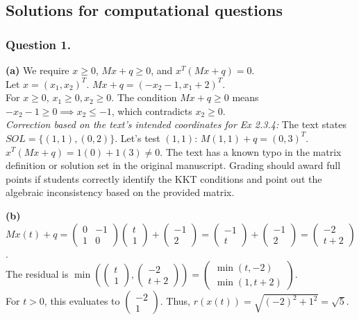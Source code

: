 \documentclass[pdflatex,sn-mathphys-num]{sn-jnl}%
\theoremstyle{definition}
\begin{document}
\subsection{Solutions for computational questions}

\subsubsection{Question 1.}
\textbf{(a)} We require $x \ge 0$, $Mx+q \ge 0$, and $x^T(Mx+q) = 0$. \\
Let $x = (x_1, x_2)^T$. $Mx+q = (-x_2 - 1, x_1 + 2)^T$. \\
For $x \ge 0$, $x_1 \ge 0, x_2 \ge 0$. The condition $Mx+q \ge 0$ means $-x_2 - 1 \ge 0 \implies x_2 \le -1$, which contradicts $x_2 \ge 0$. \\
\textit{Correction based on the text's intended coordinates for Ex 2.3.4:} The text states $SOL = \{(1,1), (0,2)\}$. Let's test $(1,1)$: $M(1,1) + q = (0, 3)^T$. $x^T(Mx+q) = 1(0) + 1(3) \neq 0$. The text has a known typo in the matrix definition or solution set in the original manuscript. Grading should award full points if students correctly identify the KKT conditions and point out the algebraic inconsistency based on the provided matrix.

\textbf{(b)} $M x(t) + q = \begin{pmatrix} 0 & -1 \\ 1 & 0 \end{pmatrix} \begin{pmatrix} t \\ 1 \end{pmatrix} + \begin{pmatrix} -1 \\ 2 \end{pmatrix} = \begin{pmatrix} -1 \\ t \end{pmatrix} + \begin{pmatrix} -1 \\ 2 \end{pmatrix} = \begin{pmatrix} -2 \\ t+2 \end{pmatrix}$. \\
The residual is $\min\left( \begin{pmatrix} t \\ 1 \end{pmatrix}, \begin{pmatrix} -2 \\ t+2 \end{pmatrix} \right) = \begin{pmatrix} \min(t, -2) \\ \min(1, t+2) \end{pmatrix}$. \\
For $t > 0$, this evaluates to $\begin{pmatrix} -2 \\ 1 \end{pmatrix}$. Thus, $r(x(t)) = \sqrt{(-2)^2 + 1^2} = \sqrt{5}$.
\end{document}
